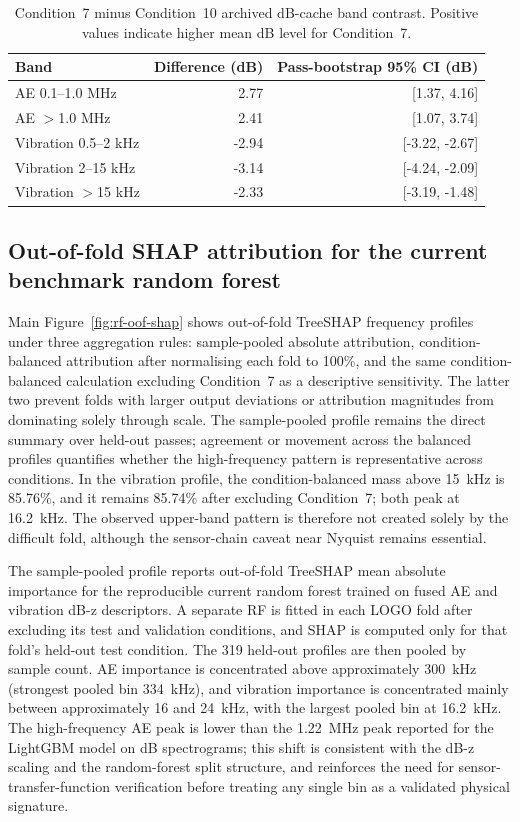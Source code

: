 \begin{table}[htbp]
\centering
\caption{Condition~7 minus Condition~10 archived dB-cache band contrast.
Positive values indicate higher mean dB level for Condition~7.}
\label{tab:supp-condition7-condition10-bands}
\begin{tabular}{@{}lrr@{}}
\toprule
Band & Difference (dB) & Pass-bootstrap 95\% CI (dB) \\
\midrule
AE 0.1--1.0 MHz & 2.77 & [1.37, 4.16] \\
AE $>$1.0 MHz & 2.41 & [1.07, 3.74] \\
Vibration 0.5--2 kHz & -2.94 & [-3.22, -2.67] \\
Vibration 2--15 kHz & -3.14 & [-4.24, -2.09] \\
Vibration $>$15 kHz & -2.33 & [-3.19, -1.48] \\
\bottomrule
\end{tabular}
\end{table}

\subsection*{Out-of-fold SHAP attribution for the current benchmark random forest}

Main Figure~\ref{fig:rf-oof-shap} shows out-of-fold TreeSHAP frequency profiles
under three aggregation rules: sample-pooled absolute attribution,
condition-balanced attribution after normalising each fold to 100\%, and the
same condition-balanced calculation excluding Condition~7 as a descriptive
sensitivity. The latter two prevent folds with larger output deviations or
attribution magnitudes from dominating solely through scale. The sample-pooled
profile remains the direct summary over held-out passes; agreement or movement
across the balanced profiles quantifies whether the high-frequency pattern is
representative across conditions. In the vibration profile, the
condition-balanced mass above 15~kHz is 85.76\%, and it remains 85.74\% after
excluding Condition~7; both peak at 16.2~kHz. The observed upper-band pattern
is therefore not created solely by the difficult fold, although the
sensor-chain caveat near Nyquist remains essential.

The sample-pooled profile reports out-of-fold TreeSHAP mean absolute
importance for the reproducible current random forest trained on fused AE and
vibration dB-z descriptors. A separate RF is fitted in each
LOGO fold after excluding its test and validation conditions, and SHAP is
computed only for that fold's held-out test condition. The 319 held-out
profiles are then pooled by sample count. AE importance is concentrated
above approximately 300~kHz (strongest pooled bin 334~kHz), and vibration
importance is concentrated mainly between approximately 16 and 24~kHz,
with the largest pooled bin at 16.2~kHz. The
high-frequency AE peak is lower than the 1.22~MHz peak reported for the
LightGBM model on dB spectrograms; this shift is consistent with the
dB-z scaling and the random-forest split structure, and
reinforces the need for sensor-transfer-function verification before
treating any single bin as a validated physical signature.

